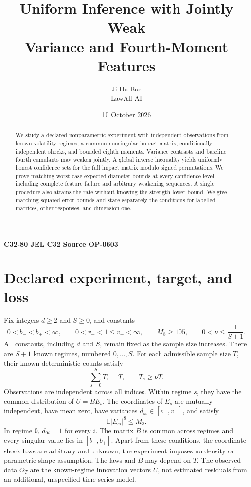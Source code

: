 \documentclass[11pt,a4paper]{article}
\title{Uniform Inference with Jointly Weak\\
Variance and Fourth-Moment Features}
\author{Ji Ho Bae\\\small LawAll AI}
\date{10 October 2026}
\numberwithin{equation}{section}
\newcommand{\E}{\mathbb E}
\begin{document}
\maketitle
\begin{center}
\small
\textbf{C32-80 \quad JEL C32 \quad Source OP-0603}
\end{center}
\begin{abstract}
We study a declared nonparametric experiment with independent observations
from known volatility regimes, a common nonsingular impact matrix,
conditionally independent shocks, and bounded eighth moments.
Variance contrasts and baseline fourth cumulants may weaken jointly.
A global inverse inequality yields uniformly honest confidence sets for
the full impact matrix modulo signed permutations. We prove matching
worst-case expected-diameter bounds at every confidence level, including
complete feature failure and arbitrary weakening sequences. A single
procedure also attains the rate without knowing the strength lower bound.
We give matching squared-error bounds and state separately the conditions
for labelled matrices, other responses, and dimension one.
\end{abstract}

\section{Declared experiment, target, and loss}\label{sec:model}
Fix integers \(d\ge2\) and \(S\ge0\), and constants
\[
 0<b_-<b_+<\infty,\qquad
 0<v_-<1\le v_+<\infty,\qquad
 M_8\ge105,\qquad 0<\nu\le\frac1{S+1}.
\]
All constants, including \(d\) and \(S\), remain fixed as the sample size
increases. There are \(S+1\) known regimes, numbered \(0,\ldots,S\).
For each admissible sample size \(T\), their known deterministic counts
satisfy
\[
 \sum_{s=0}^S T_s=T,\qquad T_s\ge\nu T.
\]
Observations are independent across all indices. Within regime \(s\),
they have the common distribution of \(U=BE_s\).
The coordinates of \(E_s\) are mutually independent, have mean zero,
have variances \(d_{si}\in[v_-,v_+]\), and satisfy
\[
 \E|E_{si}|^8\le M_8.
\]
In regime \(0\), \(d_{0i}=1\) for every \(i\). The matrix \(B\) is common
across regimes and every singular value lies in \([b_-,b_+]\).
Apart from these conditions, the coordinate shock laws are arbitrary and
unknown; the experiment imposes no density or parametric shape assumption.
The laws and \(B\) may depend on \(T\). The observed data \(O_T\) are the
known-regime innovation vectors \(U\), not estimated residuals from an
additional, unspecified time-series model.
\end{document}
